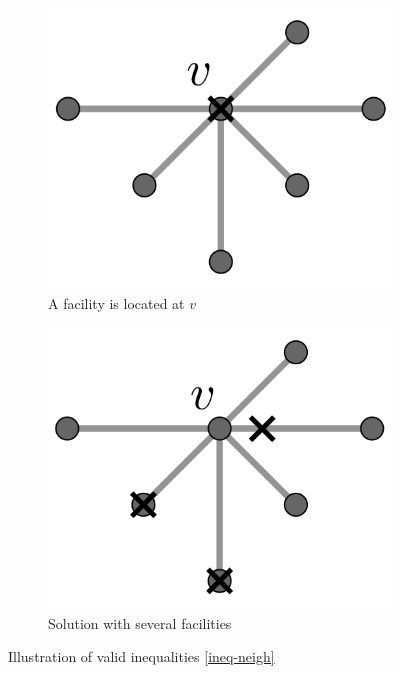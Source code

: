 \begin{figure}
	\begin{subfigure}{0.5\textwidth}
    	\centering
    	\includegraphics[scale=1.1]{Chaptercflg/media/ineq-general-1.png}
    	\caption{A facility is located at $v$}
    	\label{fig:generala}
	\end{subfigure}
 	\begin{subfigure}{0.5\textwidth}
    	\centering
    	\includegraphics[scale=1.1]{Chaptercflg/media/ineq-general-2.png}
    	\caption{Solution with several facilities}
    	\label{fig:generalb}
	\end{subfigure}
	\caption{Illustration of valid inequalities \eqref{ineq-neigh}}
	\label{fig:general}
\end{figure}
